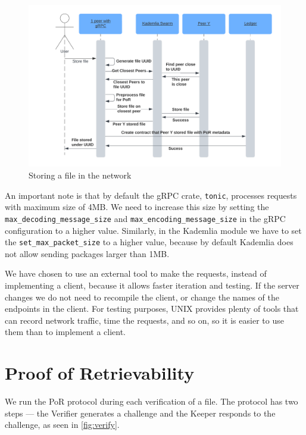 \begin{figure}
    \centering
    \includegraphics[width=1\textwidth]{gfx/store.png}
    \caption{Storing a file in the network}
    \label{fig:store}
\end{figure}

An important note is that by default the gRPC crate, \texttt{tonic},
processes requests with maximum size of 4MB.
We need to increase this size by setting the \texttt{max\_decoding\_message\_size} and
\texttt{max\_encoding\_message\_size} in the gRPC configuration to a higher value.
Similarly, in the Kademlia module we have to set the \texttt{set\_max\_packet\_size}
to a higher value, because by default Kademlia does not allow sending packages larger than 1MB.

We have chosen to use an external tool to make the requests,
instead of implementing a client, because it allows faster iteration and testing.
If the server changes we do not need to recompile the client,
or change the names of the endpoints in the client.
For testing purposes, UNIX provides plenty of tools that can record network traffic,
time the requests, and so on, so it is easier to use them than to implement a client.

\section{Proof of Retrievability}

We run the PoR protocol during each verification of a file.
The protocol has two steps --- the Verifier generates a challenge and
the Keeper responds to the challenge, as seen in \autoref{fig:verify}.

